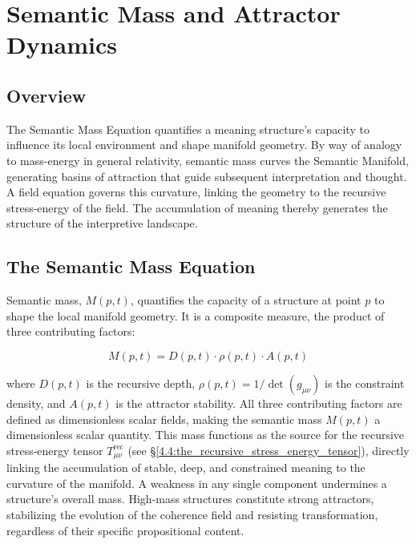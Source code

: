 \chapter{Semantic Mass and Attractor Dynamics}
\label{5:semantic_mass_and_attractor_dynamics}


\section{Overview}
\label{5.1:overview}

The Semantic Mass Equation quantifies a meaning structure's capacity to influence its local environment and shape manifold geometry. By way of analogy to mass-energy in general relativity, semantic mass curves the Semantic Manifold, generating basins of attraction that guide subsequent interpretation and thought. A field equation governs this curvature, linking the geometry to the recursive stress-energy of the field. The accumulation of meaning thereby generates the structure of the interpretive landscape.


\section{The Semantic Mass Equation}
\label{5.2:the_semantic_mass_equation}

Semantic mass, \(M(p,t)\), quantifies the capacity of a structure at point \(p\) to shape the local manifold geometry. It is a composite measure, the product of three contributing factors:

\begin{equation}
M(p, t) = D(p, t) \cdot \rho(p, t) \cdot A(p, t)
\end{equation}

where \(D(p, t)\) is the recursive depth, \(\rho(p, t) = 1/\det(g_{\mu\nu})\) is the constraint density, and \(A(p, t)\) is the attractor stability. All three contributing factors are defined as dimensionless scalar fields, making the semantic mass \(M(p,t)\) a dimensionless scalar quantity. This mass functions as the source for the recursive stress-energy tensor \(T^{\text{rec}}_{\mu\nu}\) (see \S\ref{4.4:the_recursive_stress_energy_tensor}), directly linking the accumulation of stable, deep, and constrained meaning to the curvature of the manifold. A weakness in any single component undermines a structure's overall mass. High-mass structures constitute strong attractors, stabilizing the evolution of the coherence field and resisting transformation, regardless of their specific propositional content.

